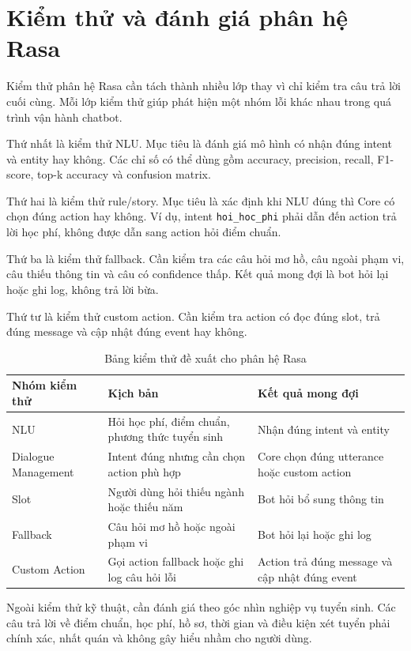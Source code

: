 \section{Kiểm thử và đánh giá phân hệ Rasa}

Kiểm thử phân hệ Rasa cần tách thành nhiều lớp thay vì chỉ kiểm tra câu trả lời cuối cùng. Mỗi lớp kiểm thử giúp phát hiện một nhóm lỗi khác nhau trong quá trình vận hành chatbot.

Thứ nhất là kiểm thử NLU. Mục tiêu là đánh giá mô hình có nhận đúng intent và entity hay không. Các chỉ số có thể dùng gồm accuracy, precision, recall, F1-score, top-k accuracy và confusion matrix.

Thứ hai là kiểm thử rule/story. Mục tiêu là xác định khi NLU đúng thì Core có chọn đúng action hay không. Ví dụ, intent \texttt{hoi\_hoc\_phi} phải dẫn đến action trả lời học phí, không được dẫn sang action hỏi điểm chuẩn.

Thứ ba là kiểm thử fallback. Cần kiểm tra các câu hỏi mơ hồ, câu ngoài phạm vi, câu thiếu thông tin và câu có confidence thấp. Kết quả mong đợi là bot hỏi lại hoặc ghi log, không trả lời bừa.

Thứ tư là kiểm thử custom action. Cần kiểm tra action có đọc đúng slot, trả đúng message và cập nhật đúng event hay không.

\begin{table}[H]
\centering
\begin{tabular}{|p{3.5cm}|p{4.5cm}|p{5cm}|}
\hline
\textbf{Nhóm kiểm thử} & \textbf{Kịch bản} & \textbf{Kết quả mong đợi} \\
\hline
NLU & Hỏi học phí, điểm chuẩn, phương thức tuyển sinh & Nhận đúng intent và entity \\
\hline
Dialogue Management & Intent đúng nhưng cần chọn action phù hợp & Core chọn đúng utterance hoặc custom action \\
\hline
Slot & Người dùng hỏi thiếu ngành hoặc thiếu năm & Bot hỏi bổ sung thông tin \\
\hline
Fallback & Câu hỏi mơ hồ hoặc ngoài phạm vi & Bot hỏi lại hoặc ghi log \\
\hline
Custom Action & Gọi action fallback hoặc ghi log câu hỏi lỗi & Action trả đúng message và cập nhật đúng event \\
\hline
\end{tabular}
\caption{Bảng kiểm thử đề xuất cho phân hệ Rasa}
\label{tab:rasa-testing-plan}
\end{table}

Ngoài kiểm thử kỹ thuật, cần đánh giá theo góc nhìn nghiệp vụ tuyển sinh. Các câu trả lời về điểm chuẩn, học phí, hồ sơ, thời gian và điều kiện xét tuyển phải chính xác, nhất quán và không gây hiểu nhầm cho người dùng.
